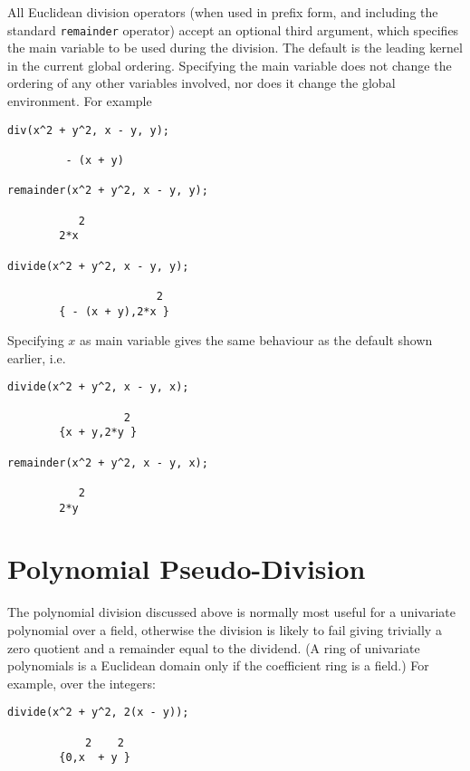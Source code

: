 \documentclass[11pt]{article}
\begin{document}
All Euclidean division operators (when used in prefix form, and
including the standard \texttt{remainder} operator) accept an optional
third argument, which specifies the main variable to be used during
the division.  The default is the leading kernel in the current global
ordering.  Specifying the main variable does not change the ordering
of any other variables involved, nor does it change the global
environment.  For example
\begin{verbatim}
div(x^2 + y^2, x - y, y);

         - (x + y)

remainder(x^2 + y^2, x - y, y);

           2
        2*x

divide(x^2 + y^2, x - y, y);

                       2
        { - (x + y),2*x }
\end{verbatim}

Specifying $x$ as main variable gives the same behaviour as the
default shown earlier, i.e.
\begin{verbatim}
divide(x^2 + y^2, x - y, x);

                  2
        {x + y,2*y }

remainder(x^2 + y^2, x - y, x);

           2
        2*y
\end{verbatim}


\section{Polynomial Pseudo-Division}

The polynomial division discussed above is normally most useful for a
univariate polynomial over a field, otherwise the division is likely
to fail giving trivially a zero quotient and a remainder equal to the
dividend.  (A ring of univariate polynomials is a Euclidean domain
only if the coefficient ring is a field.)  For example, over the
integers:
\begin{verbatim}
divide(x^2 + y^2, 2(x - y));

            2    2
        {0,x  + y }
\end{verbatim}
\end{document}
